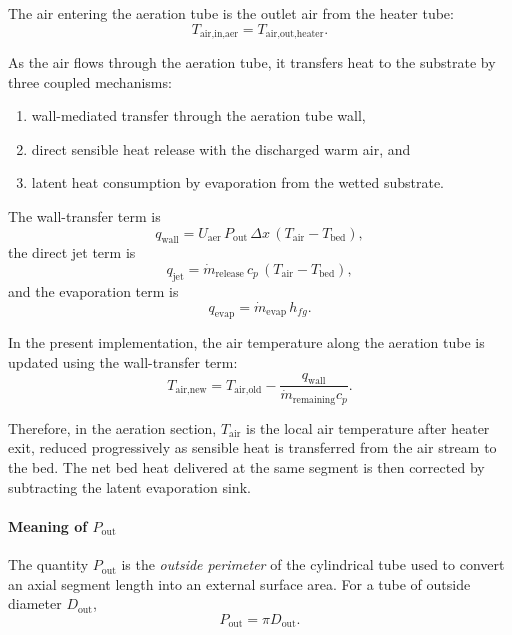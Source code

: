 \documentclass{article}
\begin{document}
The air entering the aeration tube is the outlet air from the heater tube:
\begin{equation}
T_{\text{air,in,aer}} = T_{\text{air,out,heater}}.
\end{equation}

As the air flows through the aeration tube, it transfers heat to the
substrate by three coupled mechanisms:
\begin{enumerate}
\item wall-mediated transfer through the aeration tube wall,
\item direct sensible heat release with the discharged warm air, and
\item latent heat consumption by evaporation from the wetted substrate.
\end{enumerate}

The wall-transfer term is
\begin{equation}
q_{\text{wall}}
=
U_{\text{aer}}\,P_{\text{out}}\,\Delta x\,
\left(T_{\text{air}}-T_{\text{bed}}\right),
\end{equation}
the direct jet term is
\begin{equation}
q_{\text{jet}}
=
\dot m_{\text{release}}\,c_p\,
\left(T_{\text{air}}-T_{\text{bed}}\right),
\end{equation}
and the evaporation term is
\begin{equation}
q_{\text{evap}}=\dot m_{\text{evap}}\,h_{fg}.
\end{equation}

In the present implementation, the air temperature along the aeration tube is
updated using the wall-transfer term:
\begin{equation}
T_{\text{air,new}}
=
T_{\text{air,old}}
-
\frac{q_{\text{wall}}}{\dot m_{\text{remaining}} c_p}.
\end{equation}

Therefore, in the aeration section, $T_{\text{air}}$ is the local air
temperature after heater exit, reduced progressively as sensible heat is
transferred from the air stream to the bed. The net bed heat delivered at the
same segment is then corrected by subtracting the latent evaporation sink.

\paragraph{Meaning of $P_{\text{out}}$}

The quantity $P_{\text{out}}$ is the \emph{outside perimeter} of the
cylindrical tube used to convert an axial segment length into an external
surface area. For a tube of outside diameter $D_{\text{out}}$,
\begin{equation}
P_{\text{out}} = \pi D_{\text{out}}.
\end{equation}
\end{document}
